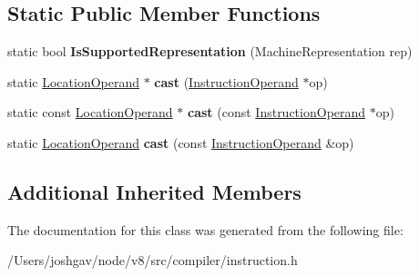 \subsection*{Static Public Member Functions}
\begin{DoxyCompactItemize}
\item 
static bool {\bfseries Is\+Supported\+Representation} (Machine\+Representation rep)\hypertarget{classv8_1_1internal_1_1compiler_1_1_location_operand_ab6141638987e754e03824fc8694f4c0e}{}\label{classv8_1_1internal_1_1compiler_1_1_location_operand_ab6141638987e754e03824fc8694f4c0e}

\item 
static \hyperlink{classv8_1_1internal_1_1compiler_1_1_location_operand}{Location\+Operand} $\ast$ {\bfseries cast} (\hyperlink{classv8_1_1internal_1_1compiler_1_1_instruction_operand}{Instruction\+Operand} $\ast$op)\hypertarget{classv8_1_1internal_1_1compiler_1_1_location_operand_a14a0a8abb4b6ac796e0fae75948a270e}{}\label{classv8_1_1internal_1_1compiler_1_1_location_operand_a14a0a8abb4b6ac796e0fae75948a270e}

\item 
static const \hyperlink{classv8_1_1internal_1_1compiler_1_1_location_operand}{Location\+Operand} $\ast$ {\bfseries cast} (const \hyperlink{classv8_1_1internal_1_1compiler_1_1_instruction_operand}{Instruction\+Operand} $\ast$op)\hypertarget{classv8_1_1internal_1_1compiler_1_1_location_operand_ad029652faf84f4ee000715b9c9d28c3d}{}\label{classv8_1_1internal_1_1compiler_1_1_location_operand_ad029652faf84f4ee000715b9c9d28c3d}

\item 
static \hyperlink{classv8_1_1internal_1_1compiler_1_1_location_operand}{Location\+Operand} {\bfseries cast} (const \hyperlink{classv8_1_1internal_1_1compiler_1_1_instruction_operand}{Instruction\+Operand} \&op)\hypertarget{classv8_1_1internal_1_1compiler_1_1_location_operand_a0beb118c4233c0d32eaca5afe2bf0990}{}\label{classv8_1_1internal_1_1compiler_1_1_location_operand_a0beb118c4233c0d32eaca5afe2bf0990}

\end{DoxyCompactItemize}
\subsection*{Additional Inherited Members}


The documentation for this class was generated from the following file\+:\begin{DoxyCompactItemize}
\item 
/\+Users/joshgav/node/v8/src/compiler/instruction.\+h\end{DoxyCompactItemize}
